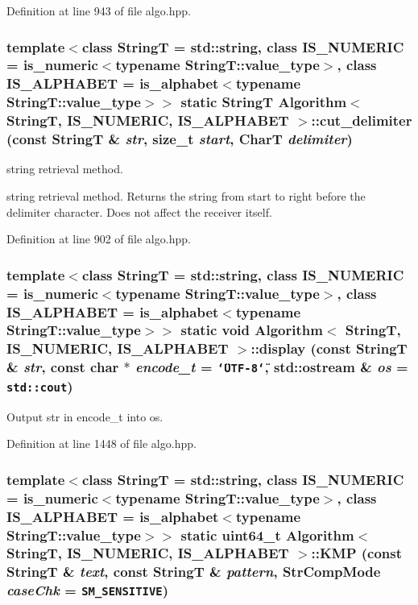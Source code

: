 Definition at line 943 of file algo.hpp.\hypertarget{classAlgorithm_70e04500b28f3c0b0b8cc75532aa4eee}{
\subsubsection[{cut\_\-delimiter}]{\setlength{\rightskip}{0pt plus 5cm}template$<$class StringT  = std::string, class IS\_\-NUMERIC  = is\_\-numeric$<$typename StringT::value\_\-type$>$, class IS\_\-ALPHABET  = is\_\-alphabet$<$typename StringT::value\_\-type$>$$>$ static StringT {\bf Algorithm}$<$ StringT, IS\_\-NUMERIC, IS\_\-ALPHABET $>$::cut\_\-delimiter (const StringT \& {\em str}, \/  size\_\-t {\em start}, \/  CharT {\em delimiter})}}
\label{classAlgorithm_70e04500b28f3c0b0b8cc75532aa4eee}


string retrieval method. 

string retrieval method. Returns the string from start to right before the delimiter character. Does not affect the receiver itself. 

Definition at line 902 of file algo.hpp.\hypertarget{classAlgorithm_1bda1a6c7890a94c5b5e3a687965bfe4}{
\subsubsection[{display}]{\setlength{\rightskip}{0pt plus 5cm}template$<$class StringT  = std::string, class IS\_\-NUMERIC  = is\_\-numeric$<$typename StringT::value\_\-type$>$, class IS\_\-ALPHABET  = is\_\-alphabet$<$typename StringT::value\_\-type$>$$>$ static void {\bf Algorithm}$<$ StringT, IS\_\-NUMERIC, IS\_\-ALPHABET $>$::display (const StringT \& {\em str}, \/  const char $\ast$ {\em encode\_\-t} = {\tt \char`\"{}UTF-8\char`\"{}}, \/  std::ostream \& {\em os} = {\tt std::cout})}}
\label{classAlgorithm_1bda1a6c7890a94c5b5e3a687965bfe4}


Output str in encode\_\-t into os. 

Definition at line 1448 of file algo.hpp.\hypertarget{classAlgorithm_9f7fcee0cfbabce55c5a9cabb1868f29}{
\subsubsection[{KMP}]{\setlength{\rightskip}{0pt plus 5cm}template$<$class StringT  = std::string, class IS\_\-NUMERIC  = is\_\-numeric$<$typename StringT::value\_\-type$>$, class IS\_\-ALPHABET  = is\_\-alphabet$<$typename StringT::value\_\-type$>$$>$ static uint64\_\-t {\bf Algorithm}$<$ StringT, IS\_\-NUMERIC, IS\_\-ALPHABET $>$::KMP (const StringT \& {\em text}, \/  const StringT \& {\em pattern}, \/  StrCompMode {\em caseChk} = {\tt SM\_\-SENSITIVE})}}
\label{classAlgorithm_9f7fcee0cfbabce55c5a9cabb1868f29}


